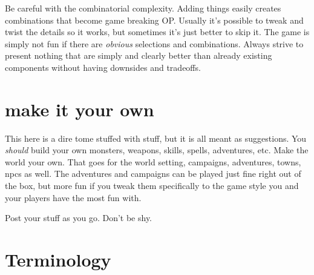Be careful with the combinatorial complexity. Adding things easily creates combinations that become game breaking OP. Usually it's possible to tweak and twist the details so it works, but sometimes it's just better to skip it. The game is simply not fun if there are \emph{obvious} selections and combinations. Always strive to present nothing that are simply and clearly better than already existing components without having downsides and tradeoffs.


\section*{make it your own}
This here is a dire tome stuffed with stuff, but it is all meant as suggestions. You \emph{should} build your own monsters, weapons, skills, spells, adventures, etc. Make the world your own. That goes for the world setting, campaigns, adventures, towns, npcs as well. The adventures and campaigns can be played just fine right out of the box, but more fun if you tweak them specifically to the game style you and your players have the most fun with.

Post your stuff as you go. Don't be shy.








\section*{Terminology}


